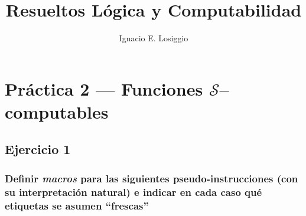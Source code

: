 \documentclass[fleqn, 11pt]{article}
\title{Resueltos Lógica y Computabilidad}
\author{Ignacio E. Losiggio}
\newcommand{\Scur}{\mathcal{S}}
\begin{document}
\maketitle
\section{Práctica 2 --- Funciones $\Scur$--computables}

\subsection{Ejercicio 1}

\subsubsection{Definir \emph{macros} para las siguientes pseudo-instrucciones
(con su interpretación natural) e indicar en cada caso qué etiquetas se asumen
``frescas''}
\end{document}
